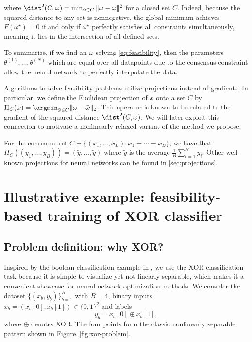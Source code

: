 where $\dist^2(C, \omega) = \min_{\bar\omega\in C} \|\omega - \bar\omega\|^2$ for a closed set $C$. Indeed, because the squared distance to any set is nonnegative, the global minimum achieves $F(\omega^\star) = 0$ if and only if $\omega^\star$ perfectly satisfies all constraints simultaneously, meaning it lies in the intersection of all defined sets.
\label{sec:feasibility}
\vspace{0.5em}
\begin{tcolorbox}
To summarize, if we find an $\omega$ solving \eqref{eq:feasibility}, then the parameters $\theta^{(1)}, \ldots, \theta^{(N)}$ which are equal over all datapoints due to the consensus constraint allow the neural network to perfectly interpolate the data.
\end{tcolorbox}
\vspace{0.5em}

Algorithms to solve feasibility problems utilize projections instead of gradients. In particular, we define the Euclidean projection of $x$ onto a set $C$ by $\Pi_C(\omega) = \argmin_{\bar \omega\in C} \|\omega - \bar\omega\|_2$. This operator is known to be related to the gradient of the squared distance $\dist^2(C,\omega)$. We will later exploit this connection to motivate a nonlinearly relaxed variant of the method we propose.

\begin{example} \label{ex:consensus}
    For the consensus set $C = \{(x_1, \ldots, x_B) : x_1 = \cdots = x_B\}$, we have that $\Pi_C((y_1, \ldots, y_B)) = (\tilde y, \ldots, \tilde y)$ where $\tilde y$ is the average $\frac{1}{B}\sum_{i=1}^B y_i$. Other well-known projections for neural networks can be found in \cref{sec:projections}.
\end{example}
\section{Illustrative example: feasibility-based training of XOR classifier}
\label{sec:feas}
\subsection{Problem definition: why XOR?}
Inspired by the boolean classification example in \cite{elser2019learning}, we use the
XOR classification task because it is simple to visualize yet not linearly separable,
which makes it a convenient showcase for neural network optimization methods. We consider the dataset $\{(x_b, y_b)\}_{b=1}^B$ with $B=4$, binary inputs
$x_b = (x_b[0], x_b[1]) \in \{0,1\}^2$ and labels
\begin{equation*}
y_b = x_b[0] \oplus x_b[1],
\end{equation*}
where $\oplus$ denotes XOR. The four
points form the classic nonlinearly separable pattern shown in
Figure~\ref{fig:xor-problem}.

